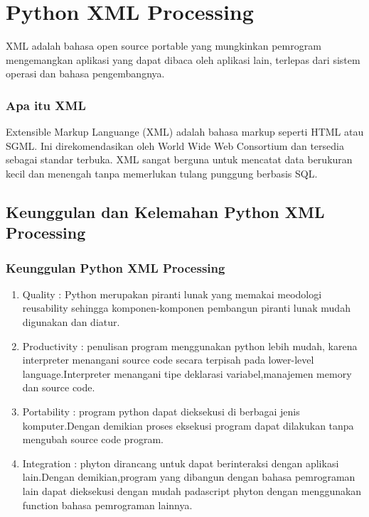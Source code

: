 
\section{Python XML Processing}
  XML adalah bahasa open source portable yang mungkinkan pemrogram mengemangkan aplikasi yang dapat dibaca oleh aplikasi lain, 
terlepas dari sistem operasi dan bahasa pengembangnya.
\subsubsection{Apa itu XML}
  Extensible Markup Languange (XML) adalah bahasa markup seperti HTML atau SGML. 
Ini direkomendasikan oleh World Wide Web Consortium dan tersedia sebagai standar terbuka.
XML sangat berguna untuk mencatat data berukuran kecil dan menengah tanpa memerlukan tulang punggung berbasis SQL. 

\subsection{Keunggulan dan Kelemahan Python XML Processing}
\subsubsection{Keunggulan Python XML Processing}
\begin{enumerate}
Keunggulan dari python dapat dijabarkan dari faktor-faktor berikut ini :
\item Quality : Python merupakan piranti lunak yang memakai meodologi reusability sehingga komponen-komponen pembangun piranti      lunak mudah digunakan dan diatur.
\item Productivity : penulisan program menggunakan python lebih mudah, karena interpreter menangani source code secara terpisah pada lower-level language.Interpreter menangani tipe deklarasi variabel,manajemen memory dan source code.
\item Portability : program python dapat dieksekusi di berbagai jenis komputer.Dengan demikian proses eksekusi program dapat dilakukan tanpa mengubah source code program.
\item Integration : phyton dirancang untuk dapat berinteraksi dengan aplikasi lain.Dengan demikian,program yang dibangun dengan bahasa pemrograman lain dapat dieksekusi dengan mudah padascript phyton dengan menggunakan function bahasa pemrograman lainnya.
\end{enumerate}
